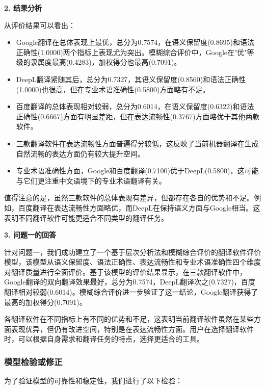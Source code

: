 \documentclass[bwprint]{cumcmthesis}
\begin{document}
\textbf{2. 结果分析}

从评价结果可以看出：

\begin{itemize}
    \item Google翻译在总体表现上最优，总分为0.7574，在语义保留度(0.8695)和语法正确性(1.0000)两个指标上表现尤为突出。模糊综合评价中，Google在"优"等级的隶属度最高(0.4283)，加权得分也最高(0.7091)。
    
    \item DeepL翻译紧随其后，总分为0.7327，其语义保留度(0.8560)和语法正确性(1.0000)也很高，但在专业术语准确性(0.5800)方面略有不足。
    
    \item 百度翻译的总体表现相对较弱，总分为0.6014，在语义保留度(0.6322)和语法正确性(0.6667)方面有明显差距，但在表达流畅性(0.3767)方面略优于其他两款软件。
    
    \item 三款翻译软件在表达流畅性方面普遍得分较低，这反映了当前机器翻译在生成自然流畅的表达方面仍有较大提升空间。
    
    \item 专业术语准确性方面，Google和百度翻译(0.7100)优于DeepL(0.5800)，这可能与它们更注重中文语境下的专业术语翻译有关。
\end{itemize}

值得注意的是，虽然三款软件的总体表现有差异，但都存在各自的优势和不足。例如，百度翻译在表达流畅性方面略优，而DeepL在保持语义方面与Google相当。这表明不同翻译软件可能更适合不同类型的翻译任务。

\textbf{3. 问题一的回答}

针对问题一，我们成功建立了一个基于层次分析法和模糊综合评价的翻译软件评价模型，该模型从语义保留度、语法正确性、表达流畅性和专业术语准确性四个维度对翻译质量进行全面评价。基于该模型的评价结果显示，在三款翻译软件中，Google翻译的双向翻译效果最好，总分为0.7574，DeepL翻译次之(0.7327)，百度翻译相对较弱(0.6014)。模糊综合评价进一步验证了这一结论，Google翻译获得了最高的加权得分(0.7091)。

各翻译软件在不同指标上有不同的优势和不足，这表明当前翻译软件虽然在某些方面表现优异，但仍有改进空间，特别是在表达流畅性方面。用户在选择翻译软件时，可以根据自身需求和翻译任务的特点，选择更适合的工具。

\subsubsection{模型检验或修正}
为了验证模型的可靠性和稳定性，我们进行了以下检验：
\end{document}
